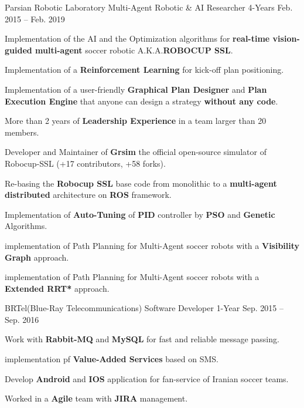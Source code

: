 \begin{cventries}
  \cventry
    {Parsian Robotic Laboratory} %
    {Multi-Agent Robotic \& AI Researcher} %
    {4-Years} %
    {Feb. 2015 -- Feb. 2019} %
    {
      \begin{cvitems} %
        \item Implementation of the AI and the Optimization algorithms for \textbf{real-time vision-guided multi-agent} soccer robotic A.K.A.\textbf{ROBOCUP SSL}.
        \item Implementation of a \textbf{Reinforcement Learning} for kick-off plan positioning.
        \item Implementation of a user-friendly \textbf{Graphical Plan Designer} and \textbf{Plan Execution Engine} that anyone can design a strategy \textbf{without any code}.
        \item More than 2 years of \textbf{Leadership Experience} in a team larger than 20 members.
        \item Developer and Maintainer of \textbf{Grsim} the official open-source simulator of Robocup-SSL (+17 contributors, +58 forks).
        \item Re-basing the \textbf{Robocup SSL} base code from monolithic  to a \textbf{multi-agent distributed} architecture on \textbf{ROS} framework.
        \item Implementation of \textbf{Auto-Tuning} of \textbf{PID} controller by \textbf{PSO} and \textbf{Genetic} Algorithms.
        \item implementation of Path Planning for Multi-Agent soccer robots with a \textbf{Visibility Graph} approach.
        \item implementation of Path Planning for Multi-Agent soccer robots with a \textbf{Extended RRT*} approach.
      \end{cvitems}
    }

  \cventry
    {BRTel(Blue-Ray Telecommunications)} %
    {Software Developer} %
    {1-Year} %
    {Sep. 2015 -- Sep. 2016} %
    {
      \begin{cvitems} %
        \item {Work with \textbf{Rabbit-MQ} and \textbf{MySQL} for fast and reliable message passing.}
        \item {implementation pf \textbf{Value-Added Services} based on SMS.}
        \item {Develop \textbf{Android} and \textbf{IOS} application for fan-service of Iranian soccer teams.}
        \item {Worked in a \textbf{Agile} team with \textbf{JIRA} management.}
      \end{cvitems}
    }


\end{cventries}
